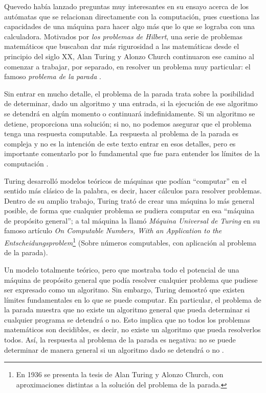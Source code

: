 \documentclass[letterpaper,12pt,oneside]{book}
\begin{document}
		Quevedo había lanzado preguntas muy interesantes en su ensayo acerca de los autómatas que se relacionan directamente con la computación, pues cuestiona
		las capacidades de una máquina para hacer algo más que lo que se lograba con una calculadora. Motivados por \textit{los problemas
		de Hilbert}, una serie de problemas matemáticos que buscaban dar más rigurosidad a las matemáticas desde el principio del siglo XX, Alan Turing
		y Alonzo Church continuaron ese camino al comenzar a trabajar, por separado, en resolver un problema muy particular: el famoso \textit{problema de la parada} \cite{ifrah_universal_2001}. 
  
        Sin entrar en mucho
		detalle, el problema de la parada trata sobre la posibilidad de determinar, dado un algoritmo y una entrada, si la ejecución de ese algoritmo se 	
		detendrá en algún momento o continuará indefinidamente. Si un algoritmo se detiene, proporciona una solución; si no, no podemos asegurar que el 
		problema tenga una respuesta computable. La respuesta al problema de la parada es compleja y no es
		la intención de este texto entrar en esos detalles, pero es importante comentarlo por lo fundamental que fue para entender los 
		límites de la computación \cite{ifrah_universal_2001}.
		
		Turing desarrolló modelos teóricos de máquinas que podían ``computar'' en el sentido más clásico de la palabra, es decir, hacer cálculos para resolver 
		problemas. Dentro de su amplio trabajo, Turing trató de crear
		una máquina lo más general posible, de forma que cualquier problema se pudiera computar en esa ``máquina de propósito general''; a tal máquina la llamó \textit{Máquina Universal de Turing} en su famoso artículo
		\textit{On Computable Numbers, With an Application to the
		Entscheidungsproblem}\footnote{En 1936 se presenta la tesis de Alan Turing y Alonzo Church, con
		aproximaciones distintas a la solución del problema de la parada.} (Sobre números computables, con aplicación al problema de la parada)\cite{ifrah_universal_2001}.
  
        Un modelo
		totalmente teórico, pero que mostraba todo el potencial de una máquina de propósito general que podía resolver cualquier problema que pudiese ser 
		expresado
		como un algoritmo. Sin embargo, Turing demostró que existen límites fundamentales en lo que se puede computar. En particular, el problema de la parada	
		muestra que no existe un algoritmo general que pueda determinar si cualquier programa se detendrá o no. Esto implica que no todos los problemas 		
		matemáticos son decidibles, es decir, no existe un algoritmo que pueda resolverlos todos. Así, la respuesta al problema de la parada es negativa: no 
		se puede determinar de manera general si un algoritmo dado se detendrá o no \cite{ifrah_universal_2001}.
  
\end{document}
